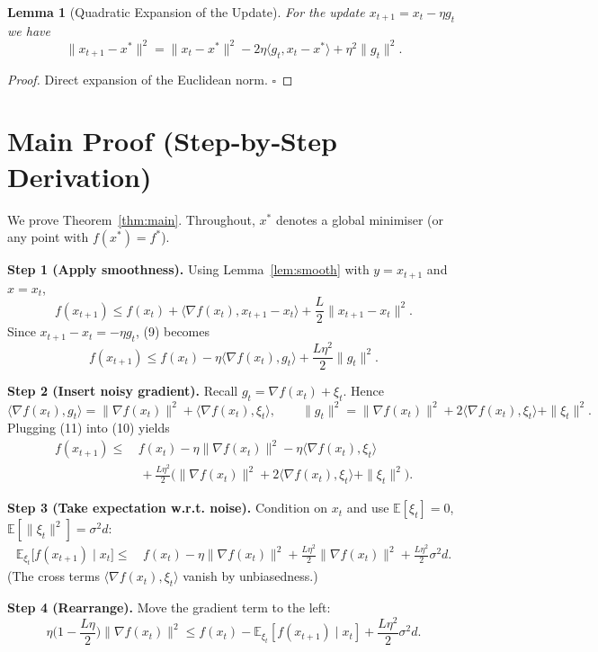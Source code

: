\documentclass[11pt]{article}
\newtheorem{lemma}{Lemma}
\newcommand{\E}{\mathbb{E}}
\begin{document}
\begin{lemma}[Quadratic Expansion of the Update]
\label{lem:expansion}
For the update $x_{t+1}=x_t-\eta g_t$ we have
\[
\|x_{t+1}-x^{*}\|^{2}
= \|x_t-x^{*}\|^{2}
-2\eta\langle g_t, x_t-x^{*}\rangle
+\eta^{2}\|g_t\|^{2}.
\tag{8}
\]
\end{lemma}
\begin{proof}
Direct expansion of the Euclidean norm. \hfill $\square$
\end{proof}

\section*{Main Proof (Step‑by‑Step Derivation)}
We prove Theorem~\ref{thm:main}. Throughout, $x^{*}$ denotes a global minimiser (or any point with $f(x^{*})=f^{*}$).

\bigskip
\noindent\textbf{Step 1 (Apply smoothness).}  
Using Lemma~\ref{lem:smooth} with $y=x_{t+1}$ and $x=x_t$,
\[
f(x_{t+1})\le f(x_t)+\langle\nabla f(x_t),x_{t+1}-x_t\rangle+\frac{L}{2}\|x_{t+1}-x_t\|^{2}.
\tag{9}
\]
Since $x_{t+1}-x_t=-\eta g_t$, (9) becomes
\[
f(x_{t+1})\le f(x_t)-\eta\langle\nabla f(x_t),g_t\rangle+\frac{L\eta^{2}}{2}\|g_t\|^{2}.
\tag{10}
\]

\noindent\textbf{Step 2 (Insert noisy gradient).}  
Recall $g_t=\nabla f(x_t)+\xi_t$. Hence
\[
\langle\nabla f(x_t),g_t\rangle
= \|\nabla f(x_t)\|^{2}+\langle\nabla f(x_t),\xi_t\rangle,
\qquad
\|g_t\|^{2}
= \|\nabla f(x_t)\|^{2}+2\langle\nabla f(x_t),\xi_t\rangle+\|\xi_t\|^{2}.
\tag{11}
\]
Plugging (11) into (10) yields
\[
\begin{aligned}
f(x_{t+1})\le &\, f(x_t)-\eta\|\nabla f(x_t)\|^{2}
-\eta\langle\nabla f(x_t),\xi_t\rangle\\
&\;+\frac{L\eta^{2}}{2}\Big(\|\nabla f(x_t)\|^{2}
+2\langle\nabla f(x_t),\xi_t\rangle+\|\xi_t\|^{2}\Big).
\end{aligned}
\tag{12}
\]

\noindent\textbf{Step 3 (Take expectation w.r.t. noise).}  
Condition on $x_t$ and use $\E[\xi_t]=0$, $\E[\|\xi_t\|^{2}]=\sigma^{2}d$:
\[
\begin{aligned}
\E_{\xi_t}\!\big[f(x_{t+1})\mid x_t\big]
\le &\, f(x_t)-\eta\|\nabla f(x_t)\|^{2}
+\frac{L\eta^{2}}{2}\|\nabla f(x_t)\|^{2}
+\frac{L\eta^{2}}{2}\sigma^{2}d .
\end{aligned}
\tag{13}
\]
(The cross terms $\langle\nabla f(x_t),\xi_t\rangle$ vanish by unbiasedness.)

\noindent\textbf{Step 4 (Rearrange).}  
Move the gradient term to the left:
\[
\eta\Big(1-\frac{L\eta}{2}\Big)\|\nabla f(x_t)\|^{2}
\le f(x_t)-\E_{\xi_t}[f(x_{t+1})\mid x_t]
+\frac{L\eta^{2}}{2}\sigma^{2}d .
\tag{14}
\]
\end{document}
